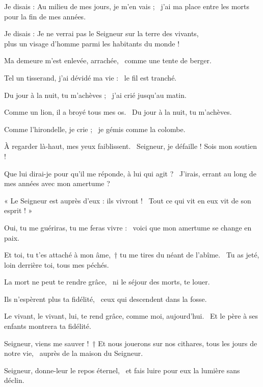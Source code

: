 \item Je disais : Au milieu de mes jours, je m’en vais ;~\psstar{} j’ai ma place entre les morts pour la fin de mes années.

\item Je disais : Je ne verrai pas le Seigneur sur la terre des vivants,~\psstar{}\\ plus un visage d’homme parmi les habitants du monde !

\item Ma demeure m’est enlevée, arrachée,~\psstar{} comme une tente de berger.

\item Tel un tisserand, j’ai dévidé ma vie :~\psstar{} le fil est tranché.

\item Du jour à la nuit, tu m’achèves ;~\psstar{} j’ai crié jusqu’au matin.

\item Comme un lion, il a broyé tous mes os.~\psstar{} Du jour à la nuit, tu m’achèves. 

\item Comme l’hirondelle, je crie ;~\psstar{} je gémis comme la colombe.

\item À regarder là-haut, mes yeux faiblissent.~\psstar{} Seigneur, je défaille ! Sois mon soutien !

\item Que lui dirai-je pour qu’il me réponde, à lui qui agit ?~\psstar{} J’irais, errant au long de mes années avec mon amertume ?

\item « Le Seigneur est auprès d’eux : ils vivront !~\psstar{} Tout ce qui vit en eux vit de son esprit ! »

\item Oui, tu me guériras, tu me feras vivre :~\psstar{} voici que mon amertume se change en paix.

\item Et toi, tu t’es attaché à mon âme,~† tu me tires du néant de l’abîme.~\psstar{} Tu as jeté, loin derrière toi, tous mes péchés.

\item La mort ne peut te rendre grâce,~\psstar{} ni le séjour des morts, te louer.

\item Ils n’espèrent plus ta fidélité,~\psstar{} ceux qui descendent dans la fosse.

\item Le vivant, le vivant, lui, te rend grâce, comme moi, aujourd’hui.~\psstar{} Et le père à ses enfants montrera ta fidélité.

\item Seigneur, viens me sauver !~† Et nous jouerons sur nos cithares, tous les jours de notre vie,~\psstar{} auprès de la maison du Seigneur.

\item Seigneur, donne-leur le repos éternel,~\psstar{} et fais luire pour eux la lumière sans déclin.